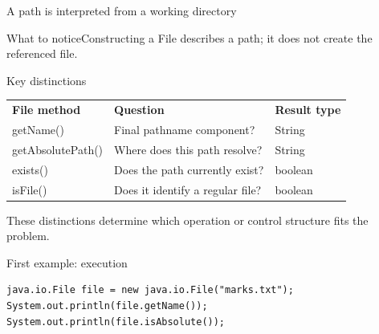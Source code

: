 \documentclass[10pt,aspectratio=169]{beamer}
\begin{document}
\begin{frame}[fragile,t]{A path is interpreted from a working directory}
\begin{center}\end{center}
\begin{block}{What to notice}Constructing a File describes a path; it does not create the referenced file.\end{block}
\end{frame}
\begin{frame}[fragile,t]{Key distinctions}
\small\renewcommand{\arraystretch}{1.5}
\begin{tabularx}{\textwidth}{>{\raggedright\arraybackslash}X>{\raggedright\arraybackslash}X>{\raggedright\arraybackslash}X}
\rowcolor{navy}
\color{white}\bfseries File method & \color{white}\bfseries Question & \color{white}\bfseries Result type\\
getName() & Final pathname component? & String\\
getAbsolutePath() & Where does this path resolve? & String\\
exists() & Does the path currently exist? & boolean\\
isFile() & Does it identify a regular file? & boolean\\
\end{tabularx}
\vspace{3mm}\footnotesize These distinctions determine which operation or control structure fits the problem.
\end{frame}

\begin{frame}[fragile,t]{First example: execution}
\begin{lstlisting}
java.io.File file = new java.io.File("marks.txt");
System.out.println(file.getName());
System.out.println(file.isAbsolute());
\end{lstlisting}
\end{frame}
\end{document}
